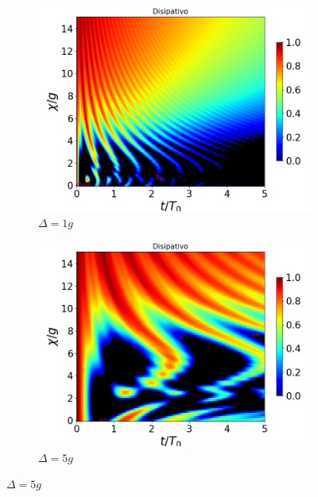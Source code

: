 \begin{figure}[h]
    \centering
    \begin{subfigure}{0.49\textwidth}
        \includegraphics[width=\textwidth]{figuras/ch4/concu/chi/eg1+ge1 d=1.0g k=0.0g J=0.0g gamma=0.25g concu chi dis.png}
        \caption{$\Delta=1g$}
        \label{fig4:concu x 1 d1}
    \end{subfigure}
    \hfill
    \begin{subfigure}{0.49\textwidth}
        \includegraphics[width=\textwidth]{figuras/ch4/concu/chi/eg1+ge1 d=5.0g k=0.0g J=0.0g gamma=0.25g concu chi dis.png}
        \caption{$\Delta=5g$}
        \label{fig4:concu x 1 d2}
    \end{subfigure}

\end{figure}
